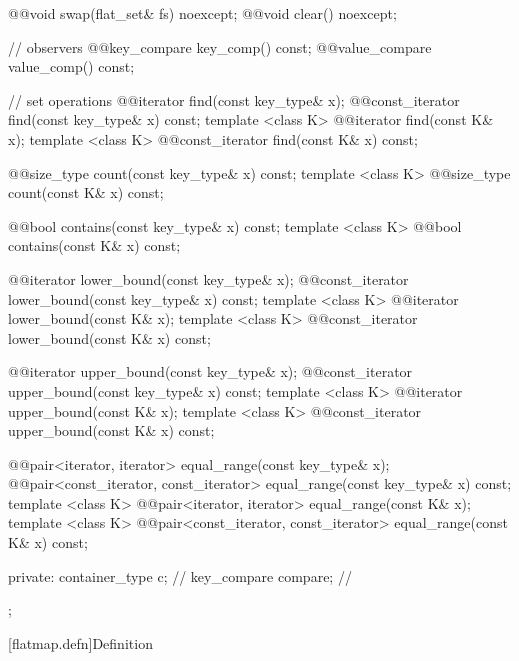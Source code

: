 \begin{codeblock}
{{    @@void swap(flat_set& fs) noexcept;
    @@void clear() noexcept;

    // observers
    @@key_compare key_comp() const;
    @@value_compare value_comp() const;

    // set operations
    @@iterator find(const key_type& x);
    @@const_iterator find(const key_type& x) const;
    template <class K> @@iterator find(const K& x);
    template <class K> @@const_iterator find(const K& x) const;

    @@size_type count(const key_type& x) const;
    template <class K> @@size_type count(const K& x) const;

    @@bool contains(const key_type& x) const;
    template <class K> @@bool contains(const K& x) const;

    @@iterator lower_bound(const key_type& x);
    @@const_iterator lower_bound(const key_type& x) const;
    template <class K> @@iterator lower_bound(const K& x);
    template <class K> @@const_iterator lower_bound(const K& x) const;

    @@iterator upper_bound(const key_type& x);
    @@const_iterator upper_bound(const key_type& x) const;
    template <class K> @@iterator upper_bound(const K& x);
    template <class K> @@const_iterator upper_bound(const K& x) const;

    @@pair<iterator, iterator> equal_range(const key_type& x);
    @@pair<const_iterator, const_iterator> equal_range(const key_type& x) const;
    template <class K>
      @@pair<iterator, iterator> equal_range(const K& x);
    template <class K>
      @@pair<const_iterator, const_iterator> equal_range(const K& x) const;

  private:
      container_type c;    // \expos
      key_compare compare; // \expos
  };
}
\end{codeblock}

\noindent\makebox[\linewidth]{\rule{\textwidth}{0.4pt}}

\setcounter{subsection}{12}
\setcounter{subsubsection}{0}
[flatmap.defn]{Definition}

